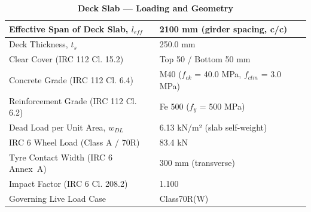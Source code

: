 \documentclass[12pt,a4paper]{report}
\numberwithin{table}{chapter}
\numberwithin{figure}{chapter}
\begin{document}
\vspace{1em}
\begin{longtable}{|L{5.5cm}|p{10.0cm}|}
\caption{\textbf{Deck Slab --- Loading and Geometry}}\\
\hline
\textnormal{Effective Span of Deck Slab, $l_{eff}$} & 2100 mm (girder spacing, c/c) \\[6pt]
\hline
\textnormal{Deck Thickness, $t_s$} & 250.0 mm \\[6pt]
\hline
\textnormal{Clear Cover (IRC 112 Cl. 15.2)} & Top 50 / Bottom 50 mm \\[6pt]
\hline
\textnormal{Concrete Grade (IRC 112 Cl. 6.4)} & M40 ($f_{ck}$ = 40.0 MPa, $f_{ctm}$ = 3.0 MPa) \\[6pt]
\hline
\textnormal{Reinforcement Grade (IRC 112 Cl. 6.2)} & Fe 500 ($f_y$ = 500 MPa) \\[6pt]
\hline
\textnormal{Dead Load per Unit Area, $w_{DL}$} & 6.13 kN/m² (slab self-weight) \\[6pt]
\hline
\textnormal{IRC 6 Wheel Load (Class A / 70R)} & 83.4 kN \\[6pt]
\hline
\textnormal{Tyre Contact Width (IRC 6 Annex~A)} & 300 mm (transverse) \\[6pt]
\hline
\textnormal{Impact Factor (IRC 6 Cl. 208.2)} & 1.100 \\[6pt]
\hline
\textnormal{Governing Live Load Case} & Class70R(W) \\[6pt]
\hline
\end{longtable}
\end{document}
